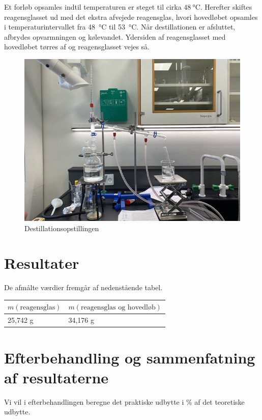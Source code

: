 \documentclass{report}
\begin{document}
Et forløb opsamles indtil temperaturen er steget til cirka $\qty{48}{\celsius}$.
Herefter skiftes reagensglasset ud med det ekstra afvejede reagensglas, hvori hovedløbet opsamles i temperaturintervallet fra \qty{48}{\celsius} til \qty{53}{\celsius}.
Når destillationen er afsluttet, afbrydes opvarmningen og kølevandet. 
Ydersiden af reagensglasset med hovedløbet tørres af og reagensglasset vejes så.
\begin{figure}[H]
\begin{center}
  \includegraphics[scale=0.5]{Destillation.jpeg}
\end{center}
\caption{Destillationsopstillingen}
\label{fig:destillation}
\end{figure}

\section*{Resultater}
De afmålte værdier fremgår af nedenstående tabel.
\begin{table}[H]
\begin{tabular}{|l|l|}
\hline
$m(\text{reagensglas})$ & $m(\text{reagensglas og hovedløb})$ \\ \hline
25,742 g                & 34,176 g                            \\ \hline
\end{tabular}
\end{table}

\section*{Efterbehandling og sammenfatning af resultaterne}
Vi vil i efterbehandlingen beregne det praktiske udbytte i \% af det teoretiske udbytte.
\end{document}
